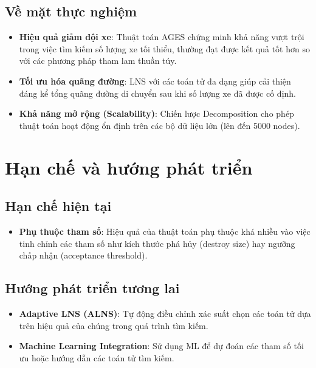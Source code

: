 \documentclass[../DoAn.tex]{subfiles}
\begin{document}
    \subsection{Về mặt thực nghiệm}

    \begin{itemize}
        \item \textbf{Hiệu quả giảm đội xe}: Thuật toán AGES chứng minh khả năng vượt trội trong việc tìm kiếm số lượng xe tối thiểu, thường đạt được kết quả tốt hơn so với các phương pháp tham lam thuần túy.

        \item \textbf{Tối ưu hóa quãng đường}: LNS với các toán tử đa dạng giúp cải thiện đáng kể tổng quãng đường di chuyển sau khi số lượng xe đã được cố định.

        \item \textbf{Khả năng mở rộng (Scalability)}: Chiến lược Decomposition cho phép thuật toán hoạt động ổn định trên các bộ dữ liệu lớn (lên đến 5000 nodes).
    \end{itemize}

    \section{Hạn chế và hướng phát triển}

    \subsection{Hạn chế hiện tại}

    \begin{itemize}
        \item \textbf{Phụ thuộc tham số}: Hiệu quả của thuật toán phụ thuộc khá nhiều vào việc tinh chỉnh các tham số như kích thước phá hủy (destroy size) hay ngưỡng chấp nhận (acceptance threshold).
    \end{itemize}

    \subsection{Hướng phát triển tương lai}

    \begin{itemize}
        \item \textbf{Adaptive LNS (ALNS)}: Tự động điều chỉnh xác suất chọn các toán tử dựa trên hiệu quả của chúng trong quá trình tìm kiếm.

        \item \textbf{Machine Learning Integration}: Sử dụng ML để dự đoán các tham số tối ưu hoặc hướng dẫn các toán tử tìm kiếm.
    \end{itemize}
\end{document}
